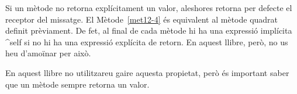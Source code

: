 Si un mètode no retorna explícitament un valor, aleshores retorna per defecte el receptor del missatge. El Mètode~\ref{met12-4} és equivalent al mètode \textsf{quadrat} definit prèviament. De fet, al final de cada mètode hi ha una expressió implícita \textsf{\textasciicircum self} si no hi ha una expressió explícita de retorn. En aquest llibre, però, no us heu d'amoïnar per això.

En aquest llibre no utilitzareu gaire aquesta propietat, però és important saber que un mètode sempre retorna un valor.

